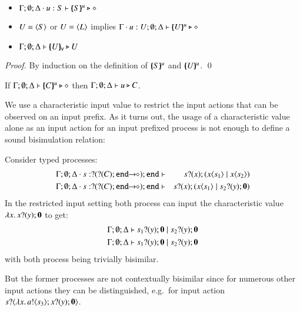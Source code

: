 \begin{proposition}\rm
$ $
	\begin{itemize}
		\item	$\Gamma; \emptyset; \Delta \cdot u:S \vdash [\!\!(S)\!\!]^{u} \triangleright \diamond$
		\item	$U = \langle S \rangle$ or $U = \langle L \rangle$ implies $\Gamma \cdot u:U; \emptyset; \Delta \vdash [\!\!(U)\!\!]^{u} \triangleright \diamond$
		\item	$\Gamma; \emptyset; \Delta \vdash [\!\!(U)\!\!]_{\mathsf{v}} \triangleright U$
	\end{itemize}
\end{proposition}

\begin{proof}
	By induction on the definition of $[\!\!(S)\!\!]^{u}$ and $[\!\!(U)\!\!]^{u}$.
	\qed
\end{proof}

\begin{corollary}\rm
	If $\Gamma; \emptyset; \Delta \vdash [\!\!(C)\!\!]^{u} \triangleright \diamond$
	then
	$\Gamma; \emptyset; \Delta \vdash u \triangleright C$.
\end{corollary}

We use a characteristic input value to restrict the input actions that 
can be observed on an input prefix.
%
As it turns out, the usage of a characteristic value
alone as an input action for an input prefixed process
is not enough to define a sound bisimulation relation:
%
\begin{example}
	\label{ex:char_proc}
	Consider typed processes:
	\begin{eqnarray*}
		\Gamma; \es; \Delta \cat s: \btinp{\shot{\btinp{C} \tinact}} \tinact &\proves& \binp{s}{x} (\appl{x}{s_1} \Par \appl{x}{s_2})\\
		\Gamma; \es; \Delta \cat s: \btinp{\shot{\btinp{C} \tinact}} \tinact &\proves& \binp{s}{x} (\appl{x}{s_1} \Par \binp{s_2}{y} \inact)
	\end{eqnarray*}
	In the restricted input setting both process can input the
	characteristic value $\lambda x.\,x ? (y) ; \mathbf{0}$
	to get:
	\begin{eqnarray*}
		\Gamma; \emptyset; \Delta \vdash s_1 ? (y) ; \mathbf{0} \;|\; s_2 ? (y) ; \mathbf{0}\\
		\Gamma; \emptyset; \Delta \vdash s_1 ? (y) ; \mathbf{0} \;|\; s_2 ? (y) ; \mathbf{0}
	\end{eqnarray*}
	with both process being trivially bisimilar.

	But the former processes are not contextually bisimilar since
	for numerous other input actions they can be distinguished,
	e.g.~for input action $s ? \langle \lambda x.\,a ! \langle s_3 \rangle ; x ? (y) ; \mathbf{0} \rangle$.
\end{example}

